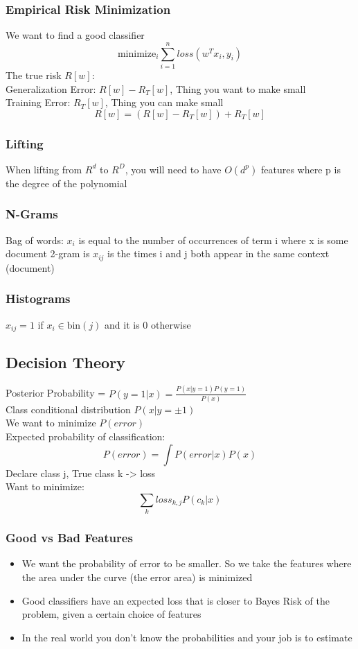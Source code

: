 \documentclass{article}
\begin{document}
\subsubsection{Empirical Risk Minimization}
We want to find a good classifier
 $$\textrm{minimize}_i \sum_{i=1}^n loss(w^Tx_i, y_i)$$
 The true risk $R[w]$:\\
 Generalization Error: $R[w] - R_T[w]$, Thing you want to make small\\
 Training Error: $R_T[w]$, Thing you can make small\\
 $$R[w] = (R[w] - R_T[w]) + R_T[w]$$

\subsubsection{Lifting}
When lifting from $R^d$ to $R^D$, you will need to have $O(d^p)$ features where p is the degree of the polynomial
\subsubsection{N-Grams}
Bag of words: $x_i$ is equal to the number of occurrences of term i where x is some document
2-gram is $x_{ij}$ is the times i and j both appear in the same context (document) 
\subsubsection{Histograms}
$x_{ij} = 1$ if $x_i \in \textrm{bin}(j)$ and it is 0 otherwise

\subsection{Decision Theory}
Posterior Probability = $P(y=1|x) = \frac{P(x|y=1)P(y=1)}{P(x)}$ \\ 
Class conditional distribution $P(x|y=\pm 1)$ \\
We want to minimize $P(error)$ \\
Expected probability of classification:
$$P(error) = \int P(error|x)P(x)$$
Declare class j, True class k -> loss \\
Want to minimize: $$\sum_k loss_{k,j} P(c_k|x)$$

\subsubsection{Good vs Bad Features}
\begin{itemize}
\item We want the probability of error to be smaller. So we take the features where the area under the curve (the error area) is minimized
\item Good classifiers have an expected loss that is closer to Bayes Risk of the problem, given a certain choice of features
\item In the real world you don't know the probabilities and your job is to estimate
\end{itemize}
\end{document}
